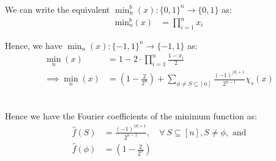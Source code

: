 \documentclass{article}
\begin{document}
\subsubsection{}
\vspace*{-8mm}

We can write the equivalent $\min^b_n(x): {\{0, 1\}}^n \rightarrow \{0, 1\}$ as:
\begin{align*}
	\text{min}^b_n(x) &= \prod_{i=1}^n x_i
\end{align*}

\noindent
Hence, we have $\min_n(x): {\{-1, 1\}}^n \rightarrow \{-1, 1\}$ as:
\begin{align*}
	\min_n(x) &= 1 - 2 \cdot \prod_{i=1}^n \frac{1 - x_i}{2} \\
\implies \min_n(x) &= \boxed{\left(1 - \frac{2}{2^n}\right) + \sum_{\phi \neq S \subseteq [n]} \frac{{(-1)}^{|S| + 1}}{2^{n - 1}}\chi_s(x)}
\end{align*}

\,\\

\noindent
Hence we have the Fourier coefficients of the minimum function as:
\begin{align*}
	\hat{f}(S) &= \frac{{(-1)}^{|S| + 1}}{2^{n - 1}}, \quad \forall\ S \subseteq [n], S \neq \phi, \text{ and} \\
	\hat{f}(\phi) &= \left(1 - \frac{2}{2^n}\right) \\
\end{align*}
\vspace*{-16mm}\begin{flushright}\qedsymbol\end{flushright}


\subsubsection{}
\vspace*{-8mm}
\end{document}
